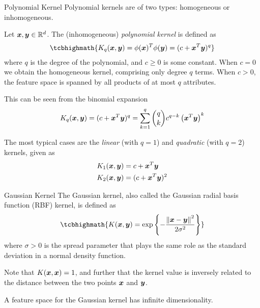 \begin{frame}{Polynomial Kernel}
  \small
Polynomial kernels are of two types: homogeneous or
inhomogeneous.


\medskip
Let ${\boldsymbol x}, {\boldsymbol y} \in {\mathord{\mathbb R}}^d$.
The (inhomogeneous) {\em polynomial
kernel} is def\/{i}ned as
  \begin{align*}
\tcbhighmath{
    K_q(\bx, \by)= \phi(\bx)^T \phi(\by) =
    (c+\bx^{T}\by)^q
}
  \end{align*}
  where $q$ is the degree of the polynomial, and $c \ge 0$ is some
  constant. When $c=0$ we obtain the homogeneous kernel,
  comprising only degree $q$ terms. When
  $c>0$, the feature space is spanned
  by all products of at most $q$ attributes.
  
  This can be seen
  from the binomial expansion
  \begin{align*}
      K_q({\boldsymbol x}, {\boldsymbol y}) = (c+{\boldsymbol x}^T{\boldsymbol y})^q
      = \sum_{k=1}^q {q \choose k} c^{q-k} \left( {\boldsymbol x}^T{\boldsymbol y} \right)^k
  \end{align*}

\medskip
The most typical cases are the {\em linear} (with $q=1$) and
  {\em quadratic} (with $q=2$) kernels, given as
  \begin{align*}
      K_1({\boldsymbol x}, {\boldsymbol y}) &= c+ {\boldsymbol x}^T{\boldsymbol y}\\
     K_2({\boldsymbol x}, {\boldsymbol y}) &= (c+ {\boldsymbol x}^T{\boldsymbol y})^2
  \end{align*}

\end{frame}


\begin{frame}{Gaussian Kernel}
The Gaussian kernel, also called the Gaussian radial basis
function (RBF) kernel,
is def\/{i}ned as
  \begin{align*}
\tcbhighmath{
      K(\bx, \by) =
    \exp\lB\{-\frac{\norm{\bx-\by}^2}{2\sigma^2} \rB\}
}
  \end{align*}
where $\sigma > 0$ is the spread parameter that plays the same
role as the standard deviation in a normal density function.

\medskip
Note that $K({\boldsymbol x},{\boldsymbol x})=1$, and further that the kernel
value is inversely related to the distance between the two
points ${\boldsymbol x}$ and ${\boldsymbol y}$.

\medskip
A feature space for the Gaussian
kernel has inf\/{i}nite dimensionality. 
\end{frame}


